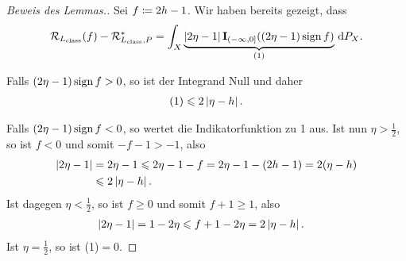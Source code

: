 \begin{proof}[Beweis des Lemmas.]
Sei $f\coloneq 2h-1$. Wir haben bereits gezeigt, dass
\begin{align*}
\mathcal{R}_{L_{\mathrm{class}}}(f) - \mathcal{R}_{L_{\mathrm{class}},P}^*
= \int_X \underbrace{\left|2\eta-1\right|\mathbf{I}_{(-\infty,0]}((2\eta-1)\operatorname{sign}
f)}_{\text{(1)}}\,\mathrm{d} P_X.
\end{align*}

Falls $(2\eta-1)\operatorname{sign} f > 0$, so ist der Integrand Null und daher
\begin{align*}
(1) \leqslant 2\left|\eta-h\right|.
\end{align*}

Falls $(2\eta-1)\operatorname{sign} f < 0$, so wertet die Indikatorfunktion zu 1 aus. Ist nun
$\eta > \frac{1}{2}$, so ist $f < 0$ und somit $-f-1 > -1$, also
\begin{align*}
\left|2\eta-1\right| &= 2\eta -1 \leqslant 2\eta-1-f = 2\eta -1 -(2h-1) = 2(\eta - h)\\
&\leqslant 2\left|\eta -h\right|.
\end{align*}
Ist dagegen $\eta < \frac{1}{2}$, so ist $f\ge 0$ und somit $f+1 \ge 1$, also
\begin{align*}
\left|2\eta-1\right| &= 1-2\eta \leqslant f+1-2\eta = 2\left|\eta-h\right|.
\end{align*}
Ist $\eta=\frac{1}{2}$, so ist (1)$=0$.\qedhere
\end{proof}

